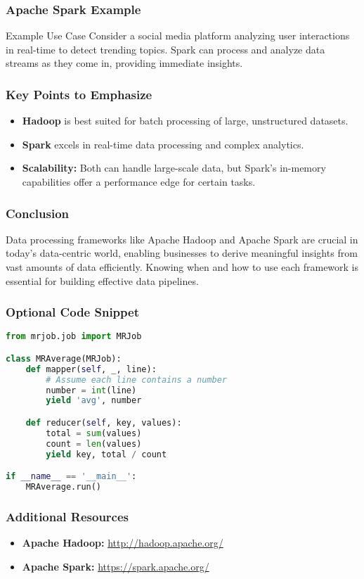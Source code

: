 \documentclass{beamer}
\begin{document}
\begin{frame}
    \frametitle{Apache Spark Example}
    \begin{block}{Example Use Case}
        Consider a social media platform analyzing user interactions in real-time to detect trending topics. Spark can process and analyze data streams as they come in, providing immediate insights.
    \end{block}
\end{frame}

\begin{frame}
    \frametitle{Key Points to Emphasize}
    \begin{itemize}
        \item \textbf{Hadoop} is best suited for batch processing of large, unstructured datasets.
        \item \textbf{Spark} excels in real-time data processing and complex analytics.
        \item \textbf{Scalability:} Both can handle large-scale data, but Spark's in-memory capabilities offer a performance edge for certain tasks.
    \end{itemize}
\end{frame}

\begin{frame}
    \frametitle{Conclusion}
    Data processing frameworks like Apache Hadoop and Apache Spark are crucial in today’s data-centric world, enabling businesses to derive meaningful insights from vast amounts of data efficiently.
    Knowing when and how to use each framework is essential for building effective data pipelines.
\end{frame}

\begin{frame}[fragile]
    \frametitle{Optional Code Snippet}
    \begin{lstlisting}[language=Python]
from mrjob.job import MRJob

class MRAverage(MRJob):
    def mapper(self, _, line):
        # Assume each line contains a number
        number = int(line)
        yield 'avg', number

    def reducer(self, key, values):
        total = sum(values)
        count = len(values)
        yield key, total / count

if __name__ == '__main__':
    MRAverage.run()
    \end{lstlisting}
\end{frame}

\begin{frame}
    \frametitle{Additional Resources}
    \begin{itemize}
        \item \textbf{Apache Hadoop:} \url{http://hadoop.apache.org/}
        \item \textbf{Apache Spark:} \url{https://spark.apache.org/}
    \end{itemize}
\end{frame}
\end{document}
